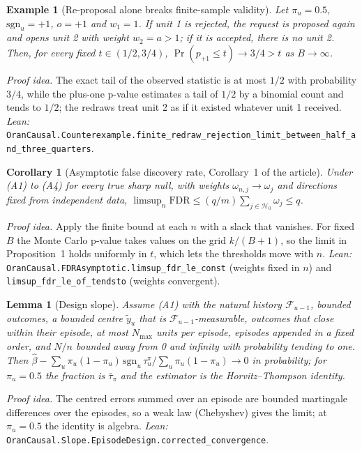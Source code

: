 \documentclass[pdflatex,sn-mathphys-num]{sn-jnl}%
\theoremstyle{thmstyleone}%
\newtheorem{corollary}{Corollary}%
\newtheorem{lemma}{Lemma}%
\theoremstyle{thmstyletwo}%
\newtheorem{example}{Example}%
\theoremstyle{thmstylethree}%
\begin{document}
\begin{example}[Re-proposal alone breaks finite-sample validity]
\label{ex:s_adaptive}
Let $\pi_u = 0.5$, $\mathrm{sgn}_u = +1$, $o = +1$ and $w_1 = 1$. If unit 1 is rejected, the request is proposed again and
opens unit 2 with weight $w_2 = a > 1$; if it is accepted, there is no unit 2. Then, for every fixed
$t \in (1/2, 3/4)$, $\Pr(p_{+1} \le t) \to 3/4 > t$ as $B \to \infty$.
\end{example}
\noindent\emph{Proof idea.} The exact tail of the observed statistic is at most $1/2$ with probability $3/4$, while the
plus-one p-value estimates a tail of $1/2$ by a binomial count and tends to $1/2$; the redraws treat unit 2 as if it
existed whatever unit 1 received. \emph{Lean:}
\texttt{OranCausal.Counterexample.finite\_\allowbreak redraw\_\allowbreak rejection\_\allowbreak limit\_\allowbreak between\_\allowbreak half\_\allowbreak and\_\allowbreak three\_\allowbreak quarters}.

\begin{corollary}[Asymptotic false discovery rate, Corollary~1 of the article]
\label{cor:s_fdr}
Under (A1) to (A4) for every true sharp null, with weights $\omega_{n,j} \to \omega_j$ and directions fixed from
independent data, $\limsup_n \mathrm{FDR} \le (q/m) \sum_{j \in \mathcal{H}_0} \omega_j \le q$.
\end{corollary}
\noindent\emph{Proof idea.} Apply the finite bound at each $n$ with a slack that vanishes. For fixed $B$ the Monte Carlo
p-value takes values on the grid $k/(B+1)$, so the limit in Proposition~1 holds uniformly in $t$, which lets the
thresholds move with $n$. \emph{Lean:} \texttt{OranCausal.FDRAsymptotic.limsup\_fdr\_le\_const} (weights fixed in $n$)
and \texttt{limsup\_fdr\_le\_of\_tendsto} (weights convergent).

\begin{lemma}[Design slope]
\label{lem:s_slope}
Assume (A1) with the natural history $\mathcal{F}_{u-1}$, bounded outcomes, a bounded centre $\tilde y_u$ that is
$\mathcal{F}_{u-1}$-measurable, outcomes that close within their episode, at most $N_{\max}$ units per episode,
episodes appended in a fixed order, and $N / n$ bounded away from 0 and infinity with probability tending to one. Then
$\hat\beta - \sum_u \pi_u (1 - \pi_u)\, \mathrm{sgn}_u\, \tau_u^{\pi} / \sum_u \pi_u (1 - \pi_u) \to 0$ in probability;
for $\pi_u = 0.5$ the fraction is $\bar\tau_{\pi}$ and the estimator is the Horvitz--Thompson identity.
\end{lemma}
\noindent\emph{Proof idea.} The centred errors summed over an episode are bounded martingale differences over the
episodes, so a weak law (Chebyshev) gives the limit; at $\pi_u = 0.5$ the identity is algebra.
\emph{Lean:} \texttt{OranCausal.Slope.EpisodeDesign.corrected\_convergence}.
\end{document}

